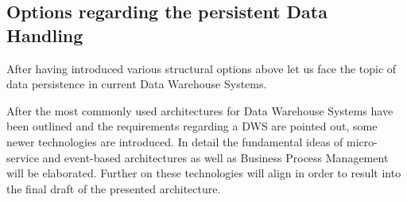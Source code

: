 \subsection{Options regarding the persistent Data Handling}
After having introduced various structural options above let us face the topic of data persistence in current Data Warehouse Systems.

\cite{sinz}


After the most commonly used architectures for Data Warehouse Systems have been outlined and the requirements regarding a DWS are pointed out, some newer technologies are introduced. In detail the fundamental ideas of micro-service and event-based architectures as well as Business Process Management will be elaborated. Further on these technologies will align in order to result into the final draft of the presented architecture.